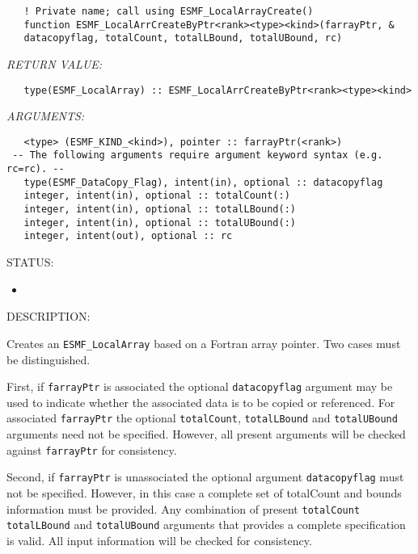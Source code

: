    
\begin{verbatim}   ! Private name; call using ESMF_LocalArrayCreate() 
   function ESMF_LocalArrCreateByPtr<rank><type><kind>(farrayPtr, & 
   datacopyflag, totalCount, totalLBound, totalUBound, rc) 
   \end{verbatim}{\em RETURN VALUE:}
\begin{verbatim}   type(ESMF_LocalArray) :: ESMF_LocalArrCreateByPtr<rank><type><kind> 
   \end{verbatim}{\em ARGUMENTS:}
\begin{verbatim}   <type> (ESMF_KIND_<kind>), pointer :: farrayPtr(<rank>) 
 -- The following arguments require argument keyword syntax (e.g. rc=rc). --
   type(ESMF_DataCopy_Flag), intent(in), optional :: datacopyflag 
   integer, intent(in), optional :: totalCount(:) 
   integer, intent(in), optional :: totalLBound(:) 
   integer, intent(in), optional :: totalUBound(:) 
   integer, intent(out), optional :: rc 
   \end{verbatim}
{\sf STATUS:}
   \begin{itemize} 
   \item{} 
   \end{itemize} 
   
{\sf DESCRIPTION:\\ }

 
   Creates an {\tt ESMF\_LocalArray} based on a Fortran array pointer. 
   Two cases must be distinguished. 
   
   First, if {\tt farrayPtr} is associated 
   the optional {\tt datacopyflag} argument may be used to indicate whether the 
   associated data is to be copied or referenced. For associated {\tt farrayPtr} 
   the optional {\tt totalCount}, {\tt totalLBound} and {\tt totalUBound} arguments need 
   not be specified. However, all present arguments will be checked against 
   {\tt farrayPtr} for consistency. 
   
   Second, if {\tt farrayPtr} is unassociated the optional argument {\tt datacopyflag} 
   must not be specified. However, in this case a complete set of totalCount and 
   bounds information must be provided. Any combination of present {\tt totalCount} 
   {\tt totalLBound} and {\tt totalUBound} arguments that provides a complete 
   specification is valid. All input information will be checked for 
   consistency. 
   
